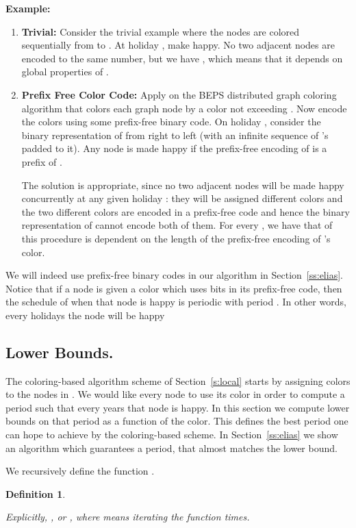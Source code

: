 \documentclass[11pt]{article}
\newtheorem{definition}{Definition}[section]
\begin{document}
{\bf Example:}
\begin{enumerate}
\item {\bf Trivial:} Consider the trivial example where the nodes are
colored sequentially from  to . At holiday , make  happy. No two adjacent nodes are encoded to the same
number, but  we have , which means that it depends on global properties of .
\item {\bf Prefix Free Color Code:} Apply on  the BEPS distributed graph coloring algorithm that colors each graph node  by a color not exceeding .
Now encode the colors using some prefix-free binary code. On
holiday , consider the binary representation of  from right to
left (with an infinite sequence of 's padded to it). Any node  is made happy if the prefix-free encoding of  is a
prefix of .

The solution is appropriate, since no two adjacent nodes will be
made happy concurrently at any given holiday : they will be assigned different colors and the
two different colors are encoded in a prefix-free code and hence the binary representation of  cannot encode both of them. For every , we have that  of this
procedure is dependent on the length of the prefix-free encoding of 's color.
\end{enumerate}

We will indeed use prefix-free binary codes in our algorithm in Section~\ref{ss:elias}. Notice that if a node is given a color  which uses  bits in its prefix-free code, then the schedule of when that node is happy is periodic with period . In other words, every  holidays the node will be happy


\subsection{Lower Bounds.}\label{ss:lower}

The coloring-based algorithm scheme of Section~\ref{s:local} starts by
assigning colors to the nodes in . We would like every node to use
its color in order to compute a period  such that every  years that node
is happy. In this section we compute lower bounds on that period as a
function of the color. This defines the best period one can hope to
achieve by the coloring-based scheme. In Section~\ref{ss:elias} we
show an algorithm which guarantees a period, that almost matches the
lower bound.

We recursively define the function .

\begin{definition}\label{d:phi}

Explicitly, , or , where
 means iterating the  function  times.
\end{definition}
\end{document}
